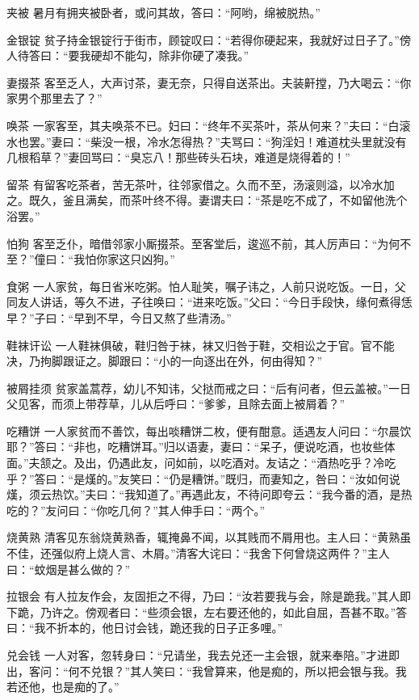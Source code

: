 \documentclass[12pt,UTF8]{ctexbook}
\begin{document}
夹被
暑月有拥夹被卧者，或问其故，答曰：“阿哟，绵被脱热。”

金银锭
贫子持金银锭行于街市，顾锭叹曰：“若得你硬起来，我就好过日子了。”傍人待答曰：“要我硬却不能勾，除非你硬了凑我。”

妻掇茶
客至乏人，大声讨茶，妻无奈，只得自送茶出。夫装鼾摚，乃大喝云：“你家男个那里去了？”

唤茶
一家客至，其夫唤茶不已。妇曰：“终年不买茶叶，茶从何来？”夫曰：“白滚水也罢。”妻曰：“柴没一根，冷水怎得热？”夫骂曰：“狗淫妇！难道枕头里就没有几根稻草？”妻回骂曰：“臭忘八！那些砖头石块，难道是烧得着的！”

留茶
有留客吃茶者，苦无茶叶，往邻家借之。久而不至，汤滚则溢，以冷水加之。既久，釜且满矣，而茶叶终不得。妻谓夫曰：“茶是吃不成了，不如留他洗个浴罢。”

怕狗
客至乏仆，暗借邻家小厮掇茶。至客堂后，逡巡不前，其人厉声曰：“为何不至？”僮曰：“我怕你家这只凶狗。”

食粥
一人家贫，每日省米吃粥。怕人耻笑，嘱子讳之，人前只说吃饭。一日，父同友人讲话，等久不进，子往唤曰：“进来吃饭。”父曰：“今日手段快，缘何煮得恁早？”子曰：“早到不早，今日又熬了些清汤。”

鞋袜讦讼
一人鞋袜俱破，鞋归咎于袜，袜又归咎于鞋，交相讼之于官。官不能决，乃拘脚跟证之。脚跟曰：“小的一向逐出在外，何由得知？”

被屑挂须
贫家盖蒿荐，幼儿不知讳，父挞而戒之曰：“后有问者，但云盖被。”一日父见客，而须上带荐草，儿从后呼曰：“爹爹，且除去面上被屑着？”

吃糟饼
一人家贫而不善饮，每出啖糟饼二枚，便有酣意。适遇友人问曰：“尔晨饮耶？”答曰：“非也，吃糟饼耳。”归以语妻，妻曰：“呆子，便说吃酒，也妆些体面。”夫颔之。及出，仍遇此友，问如前，以吃酒对。友诘之：“酒热吃乎？冷吃乎？”答曰：“是熯的。”友笑曰：“仍是糟饼。”既归，而妻知之，咎曰：“汝如何说熯，须云热饮。”夫曰：“我知道了。”再遇此友，不待问即夸云：“我今番的酒，是热吃的？”友问曰：“你吃几何？”其人伸手曰：“两个。”

烧黄熟
清客见东翁烧黄熟香，辄掩鼻不闻，以其贱而不屑用也。主人曰：“黄熟虽不佳，还强似府上烧人言、木屑。”清客大诧曰：“我舍下何曾烧这两件？”主人曰：“蚊烟是甚么做的？”

拉银会
有人拉友作会，友固拒之不得，乃曰：“汝若要我与会，除是跪我。”其人即下跪，乃许之。傍观者曰：“些须会银，左右要还他的，如此自屈，吾甚不取。”答曰：“我不折本的，他日讨会钱，跪还我的日子正多哩。”

兑会钱
一人对客，忽转身曰：“兄请坐，我去兑还一主会银，就来奉陪。”才进即出，客问：“何不兑银？”其人笑曰：“我曾算来，他是痴的，所以把会银与我。我若还他，也是痴的了。”
\end{document}
